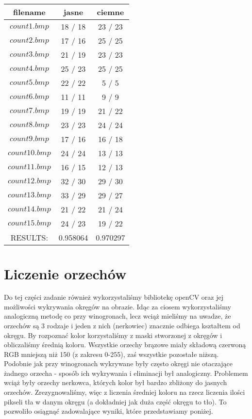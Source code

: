 \documentclass{classrep}
\begin{document}
\begin{table}[H]
  \centering
  \caption{}
  \label{tab:tab1}
  \begin{tabular}{|c|c|c|}
    \hline
          filename & jasne & ciemne\\
    \hline
         $count1.bmp$ & 18 / 18 &  23 / 23 \\
    \hline
         $count2.bmp$ & 17 / 16 &  25 / 25 \\
    \hline
         $count3.bmp$ & 21 / 19 &  23 / 23 \\
    \hline
         $count4.bmp$ & 25 / 23 &  25 / 25 \\
    \hline
         $count5.bmp$ & 22 / 22 &   5 /  5 \\
    \hline
         $count6.bmp$ & 11 / 11 &   9 /  9 \\
    \hline
         $count7.bmp$ & 19 / 19 &  21 / 22 \\
    \hline
         $count8.bmp$ & 23 / 23 &  24 / 24 \\
    \hline
         $count9.bmp$ & 17 / 16 &  16 / 18 \\
    \hline
         $count10.bmp$ & 24 / 24 &  13 / 13 \\
    \hline
         $count11.bmp$ & 16 / 15 &  12 / 13 \\
    \hline
         $count12.bmp$ & 32 / 30 &  29 / 30 \\
    \hline
         $count13.bmp$ & 33 / 29 &  29 / 27 \\
    \hline
         $count14.bmp$ & 21 / 22 &  21 / 24 \\
    \hline
         $count15.bmp$ & 24 / 23 &  19 / 22 \\
    \hline
         RESULTS:  &  0.958064& 0.970297\\
    \hline
    \hline
  \end{tabular}
\end{table}

\section{Liczenie orzechów}

Do tej części zadanie również wykorzystaliśmy bibliotekę openCV oraz jej możliwości wykrywania okręgów na obrazie. Idąc za ciosem wykorzystaliśmy analogiczną metodę co przy winogronach, lecz wciąż mieliśmy na uwadze, że orzechów są 3 rodzaje i jeden z nich (nerkowiec) znacznie odbiega kształtem od okręgu. By rozpoznać kolor korzystaliśmy z maski stworzonej z okręgów i obliczaliśmy średnią koloru. Wszystkie orzechy brązowe miały składową czerwoną RGB mniejszą niż 150 (z zakresu 0-255), zaś wszystkie pozostałe niższą. Podobnie jak przy winogronach wykrywane były często okręgi nie otaczające żadnego orzecha - sposób ich wykrywania i eliminacji był analogiczny. Problemem wciąż były orzechy nerkowca, których kolor był bardzo zbliżony do jasnych orzechów. Zrezygnowaliśmy, więc z liczenia średniej koloru na rzecz liczenia ilości pikseli tła w danym okręgu (a dokładniej jak duża część okręgu to tło). To pozwoliło osiągnąć zadowalające wyniki, które przedstawiamy poniżej.
\end{document}
